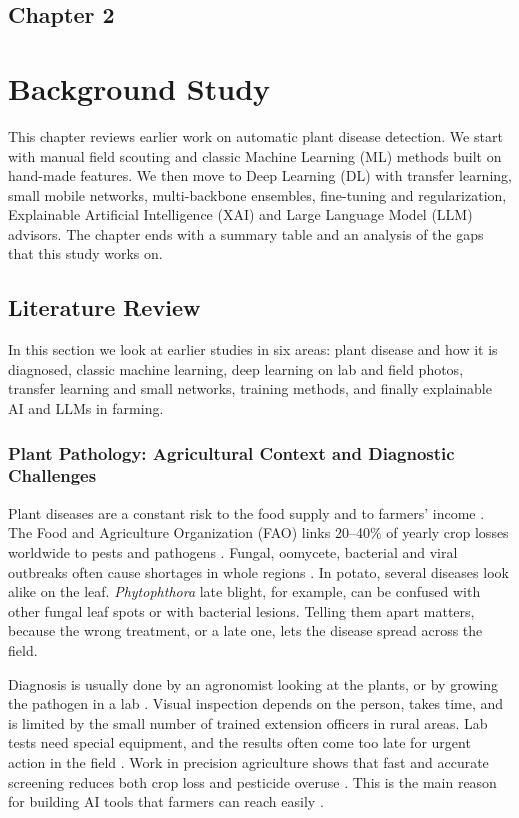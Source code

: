 \begin{center}
    \section*{\fontsize{20}{20}\selectfont Chapter 2}
\end{center}
\vspace{10mm}
\section{Background Study}

This chapter reviews earlier work on automatic plant disease detection. We start with manual field scouting and classic Machine Learning (ML) methods built on hand-made features. We then move to Deep Learning (DL) with transfer learning, small mobile networks, multi-backbone ensembles, fine-tuning and regularization, Explainable Artificial Intelligence (XAI) and Large Language Model (LLM) advisors. The chapter ends with a summary table and an analysis of the gaps that this study works on.

\subsection{Literature Review}
In this section we look at earlier studies in six areas: plant disease and how it is diagnosed, classic machine learning, deep learning on lab and field photos, transfer learning and small networks, training methods, and finally explainable AI and LLMs in farming.

\subsubsection{Plant Pathology: Agricultural Context and Diagnostic Challenges}
Plant diseases are a constant risk to the food supply and to farmers' income \cite{fao2017future}. The Food and Agriculture Organization (FAO) links 20--40\% of yearly crop losses worldwide to pests and pathogens \cite{strange2005plant}. Fungal, oomycete, bacterial and viral outbreaks often cause shortages in whole regions \cite{savary2019global}. In potato, several diseases look alike on the leaf. \textit{Phytophthora} late blight, for example, can be confused with other fungal leaf spots or with bacterial lesions. Telling them apart matters, because the wrong treatment, or a late one, lets the disease spread across the field.

Diagnosis is usually done by an agronomist looking at the plants, or by growing the pathogen in a lab \cite{barbedo2018factors}. Visual inspection depends on the person, takes time, and is limited by the small number of trained extension officers in rural areas. Lab tests need special equipment, and the results often come too late for urgent action in the field \cite{fao2017future}. Work in precision agriculture shows that fast and accurate screening reduces both crop loss and pesticide overuse \cite{savary2019global}. This is the main reason for building AI tools that farmers can reach easily \cite{lecun2015deep}.

